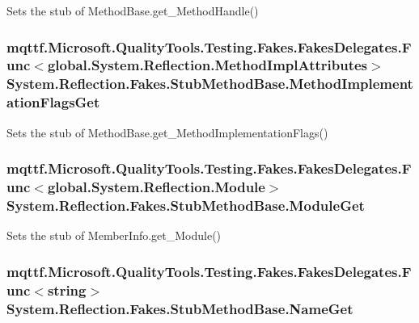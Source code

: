 Sets the stub of Method\-Base.\-get\-\_\-\-Method\-Handle()

\hypertarget{class_system_1_1_reflection_1_1_fakes_1_1_stub_method_base_a603549b4fdee7048bc99066d2adff64b}{
\subsubsection[{Method\-Implementation\-Flags\-Get}]{\setlength{\rightskip}{0pt plus 5cm}mqttf.\-Microsoft.\-Quality\-Tools.\-Testing.\-Fakes.\-Fakes\-Delegates.\-Func$<$global.\-System.\-Reflection.\-Method\-Impl\-Attributes$>$ System.\-Reflection.\-Fakes.\-Stub\-Method\-Base.\-Method\-Implementation\-Flags\-Get}}\label{class_system_1_1_reflection_1_1_fakes_1_1_stub_method_base_a603549b4fdee7048bc99066d2adff64b}


Sets the stub of Method\-Base.\-get\-\_\-\-Method\-Implementation\-Flags()

\hypertarget{class_system_1_1_reflection_1_1_fakes_1_1_stub_method_base_ab83436d9d4eb967da715b07e3c85d26d}{
\subsubsection[{Module\-Get}]{\setlength{\rightskip}{0pt plus 5cm}mqttf.\-Microsoft.\-Quality\-Tools.\-Testing.\-Fakes.\-Fakes\-Delegates.\-Func$<$global.\-System.\-Reflection.\-Module$>$ System.\-Reflection.\-Fakes.\-Stub\-Method\-Base.\-Module\-Get}}\label{class_system_1_1_reflection_1_1_fakes_1_1_stub_method_base_ab83436d9d4eb967da715b07e3c85d26d}


Sets the stub of Member\-Info.\-get\-\_\-\-Module()

\hypertarget{class_system_1_1_reflection_1_1_fakes_1_1_stub_method_base_ae7204793811be909061d9425f952a680}{
\subsubsection[{Name\-Get}]{\setlength{\rightskip}{0pt plus 5cm}mqttf.\-Microsoft.\-Quality\-Tools.\-Testing.\-Fakes.\-Fakes\-Delegates.\-Func$<$string$>$ System.\-Reflection.\-Fakes.\-Stub\-Method\-Base.\-Name\-Get}}\label{class_system_1_1_reflection_1_1_fakes_1_1_stub_method_base_ae7204793811be909061d9425f952a680}



